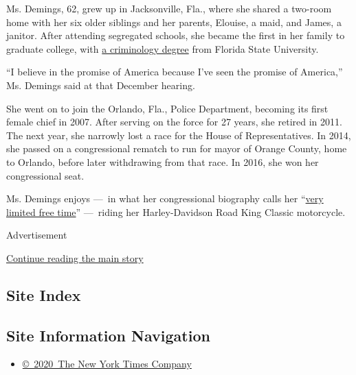 Ms. Demings, 62, grew up in Jacksonville, Fla., where she shared a
two-room home with her six older siblings and her parents, Elouise, a
maid, and James, a janitor. After attending segregated schools, she
became the first in her family to graduate college, with
\href{https://demings.house.gov/about}{a criminology degree} from
Florida State University.

``I believe in the promise of America because I've seen the promise of
America,'' Ms. Demings said at that December hearing.

She went on to join the Orlando, Fla., Police Department, becoming its
first female chief in 2007. After serving on the force for 27 years, she
retired in 2011. The next year, she narrowly lost a race for the House
of Representatives. In 2014, she passed on a congressional rematch to
run for mayor of Orange County, home to Orlando, before later
withdrawing from that race. In 2016, she won her congressional seat.

Ms. Demings enjoys ---~in what her congressional biography calls her
``\href{https://demings.house.gov/about}{very limited free time}''
---~riding her Harley-Davidson Road King Classic motorcycle.

Advertisement

\protect\hyperlink{after-bottom}{Continue reading the main story}

\hypertarget{site-index}{%
\subsection{Site Index}\label{site-index}}

\hypertarget{site-information-navigation}{%
\subsection{Site Information
Navigation}\label{site-information-navigation}}

\begin{itemize}
\tightlist
\item
  \href{https://help.nytimes3xbfgragh.onion/hc/en-us/articles/115014792127-Copyright-notice}{©~2020~The
  New York Times Company}
\end{itemize}

